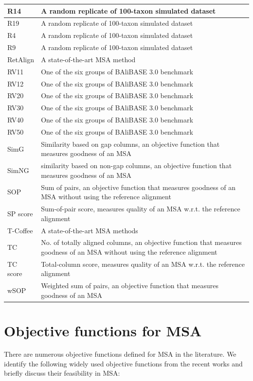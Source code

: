 \begin{table}[htbp]
\begin{tabular}{|L{2cm}|L{13cm}|}
		\hline
		R14   & A random replicate of 100-taxon simulated dataset \\
		\hline
		R19   & A random replicate of 100-taxon simulated dataset \\
		\hline
		﻿R4   & A random replicate of 100-taxon simulated dataset \\
		\hline
		﻿R9   & A random replicate of 100-taxon simulated dataset \\
		\hline
		RetAlign & A state-of-the-art MSA method \\
		\hline
		RV11  & One of the six groups of BAliBASE 3.0 benchmark \\
		\hline
		RV12  & One of the six groups of BAliBASE 3.0 benchmark \\
		\hline
		RV20  & One of the six groups of BAliBASE 3.0 benchmark \\
		\hline
		RV30  & One of the six groups of BAliBASE 3.0 benchmark \\
		\hline
		RV40  & One of the six groups of BAliBASE 3.0 benchmark \\
		\hline
		RV50  & One of the six groups of BAliBASE 3.0 benchmark \\
		\hline
		SimG  & Similarity based on gap columns, an objective function that measures goodness of an MSA \\
		\hline
		SimNG & similarity based on non-gap columns, an objective function that measures goodness of an MSA \\
		\hline
		SOP   & Sum of pairs, an objective function that measures goodness of an MSA without using the reference alignment\\
		\hline
		SP score & Sum-of-pair score, measures quality of an MSA w.r.t. the reference alignment  \\
		\hline
		T-Coffee & A state-of-the-art MSA methods \\
		\hline
		TC & No. of totally aligned columns, an objective function that measures goodness of an MSA without using the reference alignment \\
		\hline
		TC score & Total-column score, measures quality of an MSA w.r.t. the reference alignment  \\
		\hline
		wSOP  & Weighted sum of pairs, an objective function that measures goodness of an MSA \\
		\hline
	\end{tabular}%
	\label{tab:acronyms}%
\end{table}%
\section{Objective functions for MSA}
\label{sec:objective _function}
There are numerous objective functions defined for MSA in the literature. We identify the following widely used objective functions from the recent works and briefly discuss their feasibility in MSA:

